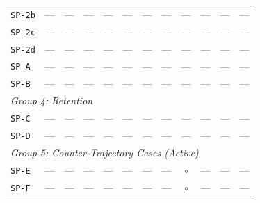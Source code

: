 \documentclass[12pt, a4paper]{article}
\begin{document}
\begin{longtable}{lccccccccccc}
\texttt{SP-2b} & {\color{gray}---} & {\color{gray}---} & {\color{gray}---} & {\color{gray}---} & {\color{gray}---} & {\color{gray}---} & {\color{gray}---} & {\color{gray}---} & {\color{gray}---} & {\color{gray}---} & {\color{gray}---} \\
\texttt{SP-2c} & {\color{gray}---} & {\color{gray}---} & {\color{gray}---} & {\color{gray}---} & {\color{gray}---} & {\color{gray}---} & {\color{gray}---} & {\color{gray}---} & {\color{gray}---} & {\color{gray}---} & {\color{gray}---} \\
\texttt{SP-2d} & {\color{gray}---} & {\color{gray}---} & {\color{gray}---} & {\color{gray}---} & {\color{gray}---} & {\color{gray}---} & {\color{gray}---} & {\color{gray}---} & {\color{gray}---} & {\color{gray}---} & {\color{gray}---} \\
\texttt{SP-A} & {\color{gray}---} & {\color{gray}---} & {\color{gray}---} & {\color{gray}---} & {\color{gray}---} & {\color{gray}---} & {\color{gray}---} & {\color{gray}---} & {\color{gray}---} & {\color{gray}---} & {\color{gray}---} \\
\texttt{SP-B} & {\color{gray}---} & {\color{gray}---} & {\color{gray}---} & {\color{gray}---} & {\color{gray}---} & {\color{gray}---} & {\color{gray}---} & {\color{gray}---} & {\color{gray}---} & {\color{gray}---} & {\color{gray}---} \\
\multicolumn{12}{l}{\small\textit{Group 4: Retention}} \\
\texttt{SP-C} & {\color{gray}---} & {\color{gray}---} & {\color{gray}---} & {\color{gray}---} & {\color{gray}---} & {\color{gray}---} & {\color{gray}---} & {\color{gray}---} & {\color{gray}---} & {\color{gray}---} & {\color{gray}---} \\
\texttt{SP-D} & {\color{gray}---} & {\color{gray}---} & {\color{gray}---} & {\color{gray}---} & {\color{gray}---} & {\color{gray}---} & {\color{gray}---} & {\color{gray}---} & {\color{gray}---} & {\color{gray}---} & {\color{gray}---} \\
\multicolumn{12}{l}{\small\textit{Group 5: Counter-Trajectory Cases (Active)}} \\
\texttt{SP-E} & {\color{gray}---} & {\color{gray}---} & {\color{gray}---} & {\color{gray}---} & {\color{gray}---} & {\color{gray}---} & {\color{gray}---} & {\color{gray}$\circ$} & {\color{gray}---} & {\color{gray}---} & {\color{gray}---} \\
\texttt{SP-F} & {\color{gray}---} & {\color{gray}---} & {\color{gray}---} & {\color{gray}---} & {\color{gray}---} & {\color{gray}---} & {\color{gray}---} & {\color{gray}$\circ$} & {\color{gray}---} & {\color{gray}---} & {\color{gray}---} \\

\end{longtable}
\end{document}
